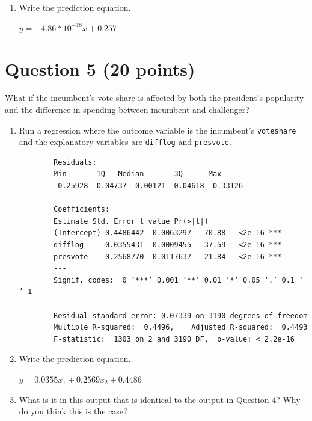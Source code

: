 \documentclass[12pt,letterpaper]{article}
\begin{document}
\begin{enumerate}
		\item Write the prediction equation.
		
		$y=-4.86*10^{-18}x+0.257$
	\end{enumerate}
	
	\newpage	

\section*{Question 5 (20 points)}
\noindent What if the incumbent's vote share is affected by both the president's popularity and the difference in spending between incumbent and challenger? 
	\begin{enumerate}
		\item Run a regression where the outcome variable is the incumbent's \texttt{voteshare} and the explanatory variables are \texttt{difflog} and \texttt{presvote}.
		
			\begin{verbatim}
		Residuals:
		Min       1Q   Median       3Q      Max 
		-0.25928 -0.04737 -0.00121  0.04618  0.33126 
		
		Coefficients:
		Estimate Std. Error t value Pr(>|t|)    
		(Intercept) 0.4486442  0.0063297   70.88   <2e-16 ***
		difflog     0.0355431  0.0009455   37.59   <2e-16 ***
		presvote    0.2568770  0.0117637   21.84   <2e-16 ***
		---
		Signif. codes:  0 ‘***’ 0.001 ‘**’ 0.01 ‘*’ 0.05 ‘.’ 0.1 ‘ ’ 1
		
		Residual standard error: 0.07339 on 3190 degrees of freedom
		Multiple R-squared:  0.4496,	Adjusted R-squared:  0.4493 
		F-statistic:  1303 on 2 and 3190 DF,  p-value: < 2.2e-16
		\end{verbatim}
			\vspace{2cm}
		\item Write the prediction equation.
		
		$y=0.0355x_{1}+0.2569x_{2}+0.4486$
		
			\vspace{5cm}
		\item What is it in this output that is identical to the output in Question 4? Why do you think this is the case?	\vspace{5cm}
	\end{enumerate}
\end{document}

